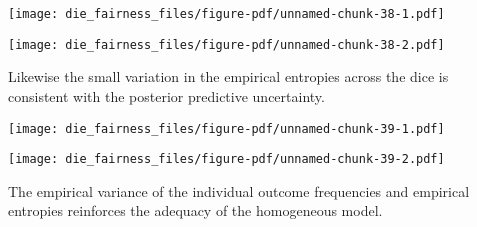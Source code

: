\documentclass[
  letterpaper,
  DIV=11,
  numbers=noendperiod]{scrartcl}
\newenvironment{Shaded}{\begin{snugshade}}{\end{snugshade}}
\newcommand{\AttributeTok}[1]{\textcolor[rgb]{0.40,0.45,0.13}{#1}}
\newcommand{\ControlFlowTok}[1]{\textcolor[rgb]{0.00,0.23,0.31}{#1}}
\newcommand{\DecValTok}[1]{\textcolor[rgb]{0.68,0.00,0.00}{#1}}
\newcommand{\FloatTok}[1]{\textcolor[rgb]{0.68,0.00,0.00}{#1}}
\newcommand{\FunctionTok}[1]{\textcolor[rgb]{0.28,0.35,0.67}{#1}}
\newcommand{\NormalTok}[1]{\textcolor[rgb]{0.00,0.23,0.31}{#1}}
\newcommand{\OtherTok}[1]{\textcolor[rgb]{0.00,0.23,0.31}{#1}}
\newcommand{\SpecialCharTok}[1]{\textcolor[rgb]{0.37,0.37,0.37}{#1}}
\newcommand{\StringTok}[1]{\textcolor[rgb]{0.13,0.47,0.30}{#1}}
\begin{document}
\texttt{[image: die\_fairness\_files/figure-pdf/unnamed-chunk-38-1.pdf]}

\texttt{[image: die\_fairness\_files/figure-pdf/unnamed-chunk-38-2.pdf]}

Likewise the small variation in the empirical entropies across the dice
is consistent with the posterior predictive uncertainty.

\begin{Shaded}
\end{Shaded}

\texttt{[image: die\_fairness\_files/figure-pdf/unnamed-chunk-39-1.pdf]}

\texttt{[image: die\_fairness\_files/figure-pdf/unnamed-chunk-39-2.pdf]}

The empirical variance of the individual outcome frequencies and
empirical entropies reinforces the adequacy of the homogeneous model.
\end{document}
